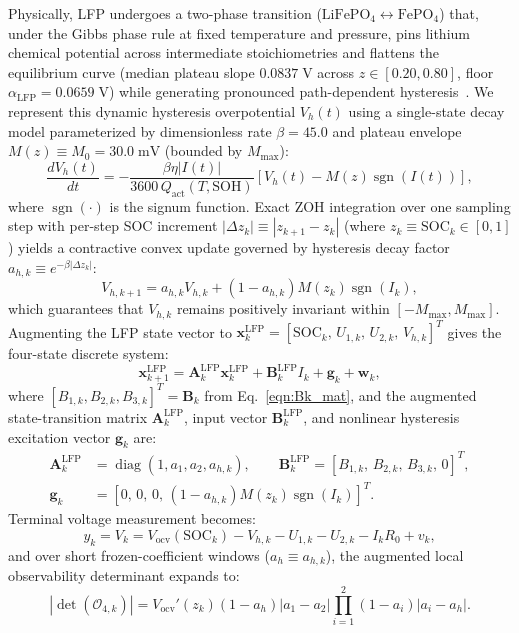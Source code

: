 \documentclass[10pt,a4paper]{article}
\begin{document}
Physically, LFP undergoes a two-phase transition ($\text{LiFePO}_4 \leftrightarrow \text{FePO}_4$) that, under the Gibbs phase rule at fixed temperature and pressure, pins lithium chemical potential across intermediate stoichiometries and flattens the equilibrium curve (median plateau slope $0.0837\;\mathrm{V}$ across $z\in[0.20,0.80]$, floor $\alpha_{\text{LFP}} = 0.0659\;\mathrm{V}$) while generating pronounced path-dependent hysteresis~\cite{Roscher2011hysteresis,Verbrugge2004hysteresis}. We represent this dynamic hysteresis overpotential $V_h(t)$ using a single-state decay model parameterized by dimensionless rate $\beta = 45.0$ and plateau envelope $M(z) \equiv M_0 = 30.0\;\mathrm{mV}$ (bounded by $M_{\max}$):
\begin{equation}\label{eqn:hysteresis_diff}
\frac{d V_h(t)}{dt} = -\frac{\beta \eta |I(t)|}{3600\,Q_{\text{act}}(T, \text{SOH})} \left[ V_h(t) - M(z) \operatorname{sgn}(I(t)) \right],
\end{equation}
where $\operatorname{sgn}(\cdot)$ is the signum function. Exact ZOH integration over one sampling step with per-step SOC increment $|\Delta z_k| \equiv |z_{k+1} - z_k|$ (where $z_k \equiv \text{SOC}_k \in [0, 1]$) yields a contractive convex update governed by hysteresis decay factor $a_{h,k} \equiv e^{-\beta |\Delta z_k|}$:
\begin{equation}\label{eqn:hysteresis_discrete}
V_{h,k+1} = a_{h,k} V_{h,k} + \left(1 - a_{h,k}\right) M(z_k) \operatorname{sgn}(I_k),
\end{equation}
which guarantees that $V_{h,k}$ remains positively invariant within $[-M_{\max}, M_{\max}]$. Augmenting the LFP state vector to $\mathbf{x}_k^{\text{LFP}} = [\text{SOC}_k,\, U_{1,k},\, U_{2,k},\, V_{h,k}]^T$ gives the four-state discrete system:
\begin{equation}\label{eqn:x_lfp}
\mathbf{x}_{k+1}^{\text{LFP}} = \mathbf{A}_k^{\text{LFP}} \mathbf{x}_k^{\text{LFP}} + \mathbf{B}_k^{\text{LFP}} I_k + \mathbf{g}_k + \mathbf{w}_k,
\end{equation}
where $[B_{1,k}, B_{2,k}, B_{3,k}]^T = \mathbf{B}_k$ from Eq.~\eqref{eqn:Bk_mat}, and the augmented state-transition matrix $\mathbf{A}_k^{\text{LFP}}$, input vector $\mathbf{B}_k^{\text{LFP}}$, and nonlinear hysteresis excitation vector $\mathbf{g}_k$ are:
\begin{align*}
\mathbf{A}_k^{\text{LFP}} &= \operatorname{diag}(1, a_1, a_2, a_{h,k}), \qquad
\mathbf{B}_k^{\text{LFP}} = [B_{1,k},\, B_{2,k},\, B_{3,k},\, 0]^T, \\
\mathbf{g}_k &= \left[0,\, 0,\, 0,\, (1 - a_{h,k}) M(z_k) \operatorname{sgn}(I_k)\right]^T.
\end{align*}
Terminal voltage measurement becomes:
\begin{equation}\label{eqn:vt_lfp}
y_k = V_k = V_{\text{ocv}}(\text{SOC}_k) - V_{h,k} - U_{1,k} - U_{2,k} - I_k R_0 + v_k,
\end{equation}
and over short frozen-coefficient windows ($a_h \equiv a_{h,k}$), the augmented local observability determinant expands to:
\begin{equation}\label{eqn:det_obs_lfp}
|\det(\mathcal{O}_{4,k})| = V_{\text{ocv}}'(z_k)(1 - a_h)|a_1 - a_2|\prod_{i=1}^2 (1 - a_i)|a_i - a_h|.
\end{equation}
\end{document}
